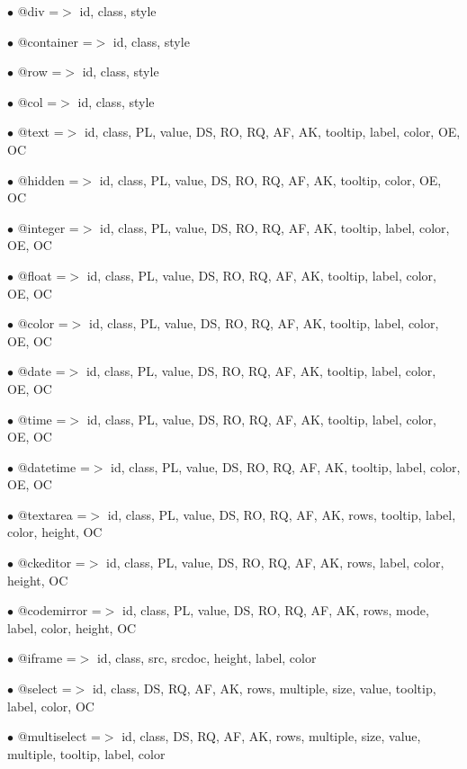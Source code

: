 \documentclass[a4paper]{article}
\begin{document}
\begin{compactitem}
\item[\color{myblue}$\bullet$] @div         =$>$ id, class, style
\item[\color{myblue}$\bullet$] @container   =$>$ id, class, style
\item[\color{myblue}$\bullet$] @row         =$>$ id, class, style
\item[\color{myblue}$\bullet$] @col         =$>$ id, class, style
\item[\color{myblue}$\bullet$] @text        =$>$ id, class, PL, value, DS, RO, RQ, AF, AK, tooltip, label, color, OE, OC
\item[\color{myblue}$\bullet$] @hidden      =$>$ id, class, PL, value, DS, RO, RQ, AF, AK, tooltip, color, OE, OC
\item[\color{myblue}$\bullet$] @integer     =$>$ id, class, PL, value, DS, RO, RQ, AF, AK, tooltip, label, color, OE, OC
\item[\color{myblue}$\bullet$] @float       =$>$ id, class, PL, value, DS, RO, RQ, AF, AK, tooltip, label, color, OE, OC
\item[\color{myblue}$\bullet$] @color       =$>$ id, class, PL, value, DS, RO, RQ, AF, AK, tooltip, label, color, OE, OC
\item[\color{myblue}$\bullet$] @date        =$>$ id, class, PL, value, DS, RO, RQ, AF, AK, tooltip, label, color, OE, OC
\item[\color{myblue}$\bullet$] @time        =$>$ id, class, PL, value, DS, RO, RQ, AF, AK, tooltip, label, color, OE, OC
\item[\color{myblue}$\bullet$] @datetime    =$>$ id, class, PL, value, DS, RO, RQ, AF, AK, tooltip, label, color, OE, OC
\item[\color{myblue}$\bullet$] @textarea    =$>$ id, class, PL, value, DS, RO, RQ, AF, AK, rows, tooltip, label, color, height, OC
\item[\color{myblue}$\bullet$] @ckeditor    =$>$ id, class, PL, value, DS, RO, RQ, AF, AK, rows, label, color, height, OC
\item[\color{myblue}$\bullet$] @codemirror  =$>$ id, class, PL, value, DS, RO, RQ, AF, AK, rows, mode, label, color, height, OC
\item[\color{myblue}$\bullet$] @iframe      =$>$ id, class, src, srcdoc, height, label, color
\item[\color{myblue}$\bullet$] @select      =$>$ id, class, DS, RQ, AF, AK, rows, multiple, size, value, tooltip, label, color, OC
\item[\color{myblue}$\bullet$] @multiselect =$>$ id, class, DS, RQ, AF, AK, rows, multiple, size, value, multiple, tooltip, label, color

\end{compactitem}
\end{document}
